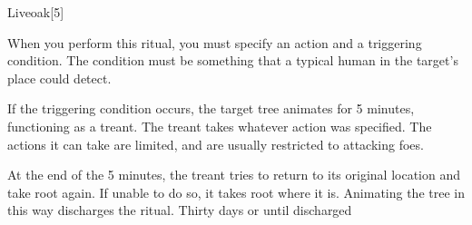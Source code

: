 \begin{spellsection}{Liveoak}[5]
    \begin{spellheader}
    \end{spellheader}
    \begin{spellcontent}
        \begin{spelltargetinginfo}
        \end{spelltargetinginfo}
        \begin{spelleffects}
            \spellspecial When you perform this ritual, you must specify an action and a triggering condition. The condition must be something that a typical human in the target's place could detect.

            \spelleffect If the triggering condition occurs, the target tree animates for 5 minutes, functioning as a treant. The treant takes whatever action was specified. The actions it can take are limited, and are usually restricted to attacking foes.

            At the end of the 5 minutes, the treant tries to return to its original location and take root again. If unable to do so, it takes root where it is. Animating the tree in this way discharges the ritual.
            \spelldur Thirty days or until discharged
        \end{spelleffects}
    \end{spellcontent}
    \begin{spellfooter}
    \end{spellfooter}
    \begin{spellaugments}
    \end{spellaugments}
\end{spellsection}

